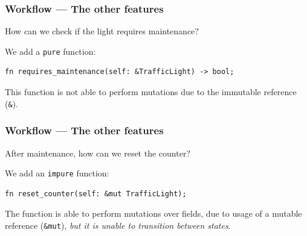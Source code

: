 \documentclass[bigger,notes,aspectratio=169]{beamer}
\begin{document}
\begin{frame}[fragile]
    \frametitle{Workflow --- The other features}
    How can we check if the light requires maintenance?

    We add a \texttt{pure} function:
    \begin{listing}
        \centering
        \begin{verbatim}
fn requires_maintenance(self: &TrafficLight) -> bool;
        \end{verbatim}
    \end{listing}
    This function is not able to perform mutations due to the immutable reference (\texttt{\&}).

\end{frame}

\begin{frame}[fragile]
    \frametitle{Workflow --- The other features}
    After maintenance, how can we reset the counter?

    We add an \texttt{impure} function:
    \begin{listing}
        \centering
        \begin{verbatim}
fn reset_counter(self: &mut TrafficLight);
        \end{verbatim}
    \end{listing}
    The function is able to perform mutations over fields, due to usage of a mutable reference (\texttt{\&mut}),
    \emph{but it is unable to transition between states}.

\end{frame}
\end{document}
